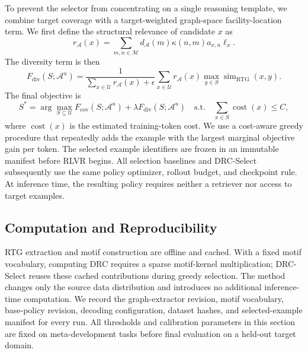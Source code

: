 To prevent the selector from concentrating on a single reasoning template, we
combine target coverage with a target-weighted graph-space facility-location
term.  We first define the structural relevance of candidate $x$ as
\begin{equation}
    r_{\mathcal{A}}(x)
    = \sum_{m,n\in\mathcal{M}}
      d_{\mathcal{A}}(m)\kappa(n,m)a_{x,n}\ell_x.
\end{equation}
The diversity term is then
\begin{equation}
    F_{\mathrm{div}}(S;\mathcal{A}^{u})
    = \frac{1}{\sum_{x\in\mathcal{U}}r_{\mathcal{A}}(x)+\epsilon}
      \sum_{x\in\mathcal{U}}
      r_{\mathcal{A}}(x)
      \max_{y\in S}\operatorname{sim}_{\mathrm{RTG}}(x,y).
\end{equation}
The final objective is
\begin{equation}
    S^* = \arg\max_{S\subseteq\mathcal{U}}
      F_{\mathrm{cov}}(S;\mathcal{A}^{u})
      + \lambda F_{\mathrm{div}}(S;\mathcal{A}^{u})
    \quad\text{s.t.}\quad
      \sum_{x\in S}\operatorname{cost}(x)\leq C,
    \label{eq:drc-select}
\end{equation}
where $\operatorname{cost}(x)$ is the estimated training-token cost.  We use a
cost-aware greedy procedure that repeatedly adds the example with the largest
marginal objective gain per token.  The selected example identifiers are
frozen in an immutable manifest before RLVR begins.  All selection baselines
and DRC-Select subsequently use the same policy optimizer, rollout budget, and
checkpoint rule.  At inference time, the resulting policy requires neither a
retriever nor access to target examples.

\subsection{Computation and Reproducibility}
\label{sec:method-computation}

RTG extraction and motif construction are offline and cached.  With a fixed
motif vocabulary, computing DRC requires a sparse motif-kernel multiplication;
DRC-Select reuses these cached contributions during greedy selection.  The
method changes only the source data distribution and introduces no additional
inference-time computation.  We record the graph-extractor revision, motif
vocabulary, base-policy revision, decoding configuration, dataset hashes, and
selected-example manifest for every run.  All thresholds and calibration
parameters in this section are fixed on meta-development tasks before final
evaluation on a held-out target domain.

